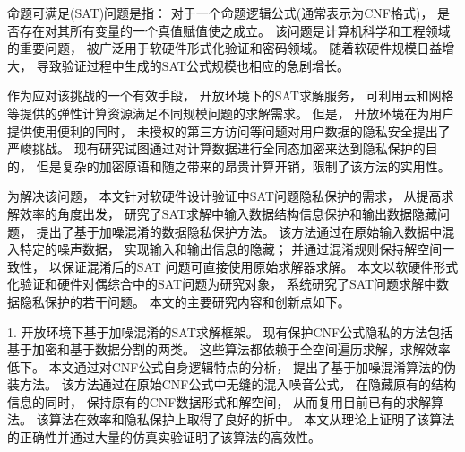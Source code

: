 \begin{cabstract}
命题可满足(SAT)问题是指：
对于一个命题逻辑公式(通常表示为CNF格式)，
是否存在对其所有变量的一个真值赋值使之成立。
该问题是计算机科学和工程领域的重要问题，
被广泛用于软硬件形式化验证和密码领域。
随着软硬件规模日益增大，
导致验证过程中生成的SAT公式规模也相应的急剧增长。

作为应对该挑战的一个有效手段，
开放环境下的SAT求解服务，
可利用云和网格等提供的弹性计算资源满足不同规模问题的求解需求。
但是，
开放环境在为用户提供使用便利的同时，
未授权的第三方访问等问题对用户数据的隐私安全提出了严峻挑战。
现有研究试图通过对计算数据进行全同态加密来达到隐私保护的目的，
但是复杂的加密原语和随之带来的昂贵计算开销，限制了该方法的实用性。

为解决该问题，
本文针对软硬件设计验证中SAT问题隐私保护的需求，
从提高求解效率的角度出发，
研究了SAT求解中输入数据结构信息保护和输出数据隐藏问题，
提出了基于加噪混淆的数据隐私保护方法。
该方法通过在原始输入数据中混入特定的噪声数据，
实现输入和输出信息的隐藏；
并通过混淆规则保持解空间一致性，
以保证混淆后的SAT 问题可直接使用原始求解器求解。
本文以软硬件形式化验证和硬件对偶综合中的SAT问题为研究对象，
系统研究了SAT问题求解中数据隐私保护的若干问题。
本文的主要研究内容和创新点如下。

1. 开放环境下基于加噪混淆的SAT求解框架。
现有保护CNF公式隐私的方法包括基于加密和基于数据分割的两类。
这些算法都依赖于全空间遍历求解，求解效率低下。
本文通过对CNF公式自身逻辑特点的分析，
提出了基于加噪混淆算法的伪装方法。
该方法通过在原始CNF公式中无缝的混入噪音公式，
在隐藏原有的结构信息的同时，
保持原有的CNF数据形式和解空间，
从而复用目前已有的求解算法。
该算法在效率和隐私保护上取得了良好的折中。
本文从理论上证明了该算法的正确性并通过大量的仿真实验证明了该算法的高效性。


\end{cabstract}

